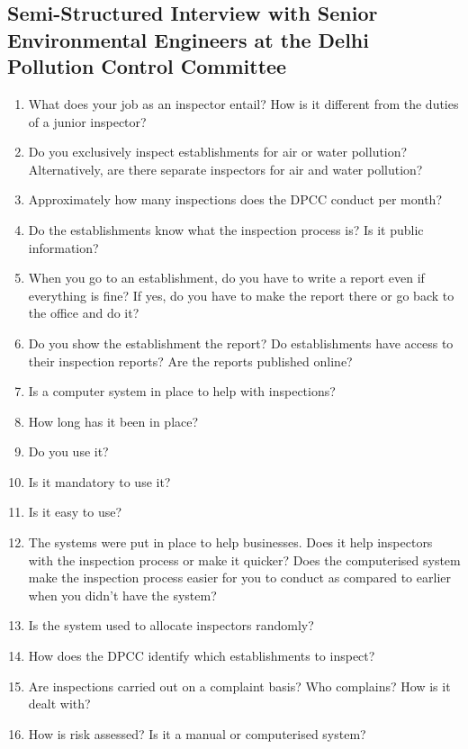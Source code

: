\documentclass[a4paper, 12pt]{article}
\begin{document}
		\subsection{Semi-Structured Interview with Senior Environmental Engineers at the Delhi Pollution Control Committee}
                    \begin{mdframed}[backgroundcolor=gray!20]
		\begin{enumerate}
		\item{What does your job as an inspector entail? How is it different from the duties of a junior inspector?}
		\item{Do you exclusively inspect establishments for air or water pollution? Alternatively, are there separate inspectors for air and water pollution?}
		\item{Approximately how many inspections does the DPCC conduct per month?}
		\item{Do the establishments know what the inspection process is? Is it public information?}
		\item{When you go to an establishment, do you have to write a report even if everything is fine? If yes, do you have to make the report there or go back to the office and do it?}
		\item{Do you show the establishment the report? Do establishments have access to their inspection reports? Are the reports published online?}
		\item{Is a computer system in place to help with inspections?}
		\item{How long has it been in place?}
		\item{Do you use it? }
		\item{Is it mandatory to use it?} 
		\item{Is it easy to use? }
		\item{The systems were put in place to help businesses. Does it help inspectors with the inspection process or make it quicker? Does the computerised system make the inspection process easier for you to conduct as compared to earlier when you didn’t have the system?}
		\item{Is the system used to allocate inspectors randomly?}
		\item{How does the DPCC identify which establishments to inspect?}
		\item{Are inspections carried out on a complaint basis? Who complains? How is it dealt with?}
		\item{How is risk assessed? Is it a manual or computerised system?}

\end{enumerate}
\end{mdframed}
\end{document}
